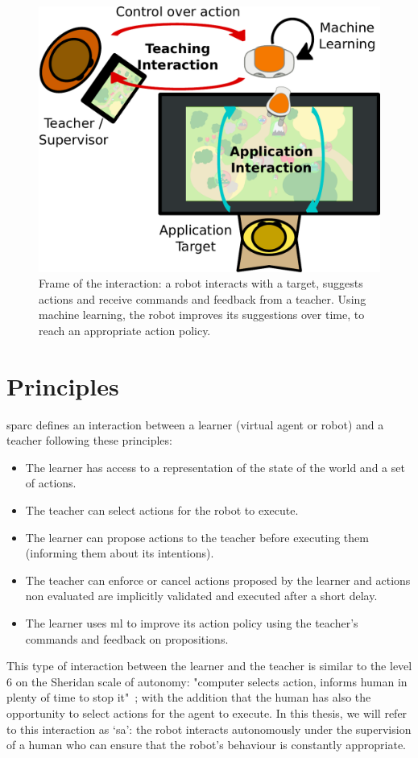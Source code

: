 \begin{figure}[ht]
	\includegraphics[width=.6\linewidth]{setup.pdf}
	\centering
	\caption{Frame of the interaction: a robot interacts with a target, suggests actions and receive commands and feedback from a teacher. Using machine learning, the robot improves its suggestions over time, to reach an appropriate action policy.}
	\label{fig:frame}
\end{figure}

\section{Principles} \label{sec:sparc_principles}

\gls{sparc} defines an interaction between a learner (virtual agent or robot) and a teacher following these principles:
\begin{itemize}
	\item The learner has access to a representation of the state of the world and a set of actions.
	\item The teacher can select actions for the robot to execute.
	\item The learner can propose actions to the teacher before executing them (informing them about its intentions).
	\item The teacher can enforce or cancel actions proposed by the learner and actions non evaluated are implicitly validated and executed after a short delay.
	\item The learner uses \gls{ml} to improve its action policy using the teacher's commands and feedback on propositions.
\end{itemize} 

This type of interaction between the learner and the teacher is similar to the level 6 on the Sheridan scale of autonomy: "computer selects action, informs human in plenty of time to stop it"~\citep{sheridan1978human}; with the addition that the human has also the opportunity to select actions for the agent to execute. In this thesis, we will refer to this interaction as `\gls{sa}': the robot interacts autonomously under the supervision of a human who can ensure that the robot's behaviour is constantly appropriate.

